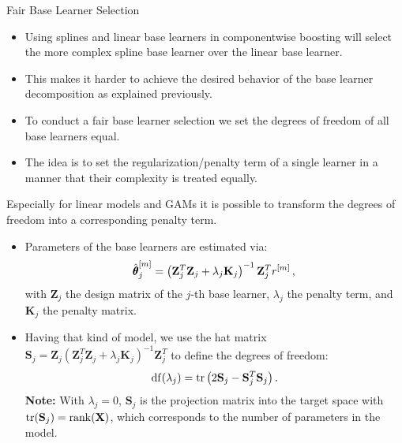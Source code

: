 \begin{vbframe}{Fair Base Learner Selection}

\begin{itemize}

  \item
    Using splines and linear base learners in componentwise boosting will select the more complex spline base learner over the linear base learner.

  \item
    This makes it harder to achieve the desired behavior of the base learner decomposition as explained previously.

  \item
    To conduct a fair base learner selection we set the degrees of freedom of all base learners equal.

  \item
    The idea is to set the regularization/penalty term of a single learner in a manner that their complexity is treated equally.

\end{itemize}

\framebreak

Especially for linear models and GAMs it is possible to transform the degrees of freedom into a corresponding penalty term.
\begin{itemize}

  \item
    Parameters of the base learners are estimated via:
    $$
    \hat{\pmb\theta}_j^{[m]} = \left(\mathbf{Z}_j^T \mathbf{Z}_j + \lambda_j \mathbf{K}_j\right)^{-1}\mathbf{Z}_j^T r^{[m]}\,,
    $$
    with $\mathbf{Z}_j$ the design matrix of the $j$-th base learner, $\lambda_j$ the penalty term, and $\mathbf{K}_j$ the penalty matrix.

  \item
    Having that kind of model, we use the hat matrix $\mathbf{S}_j = \mathbf{Z}_j\left(\mathbf{Z}_j^T \mathbf{Z}_j + \lambda_j \mathbf{K}_j\right)^{-1}\mathbf{Z}_j^T$ to define the degrees of freedom:
    $$
    \operatorname{df}(\lambda_j) = \operatorname{tr}\left(2\mathbf{S}_j - \mathbf{S}_j^T \mathbf{S}_j\right).
    $$
    \textbf{Note:} With $\lambda_j = 0$, $\mathbf{S}_j$ is the projection matrix into the target space with $\operatorname{tr}(\mathbf{S}_j) = \operatorname{rank}(\mathbf{X})$, which corresponds to the number of parameters in the model.

\end{itemize}

\framebreak


\end{vbframe}
